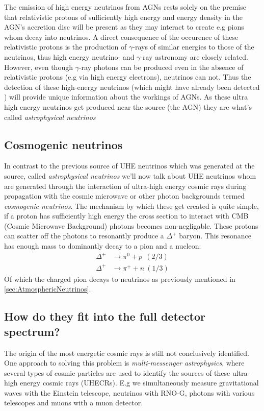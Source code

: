 \documentclass[11pt,a4paper,faculty=we,language=en,doctype=report]{cls/ugent-doc}
\begin{document}
The emission of high energy neutrinos from AGNs rests solely on the premise
that relativistic protons of sufficiently high energy and energy density in the
AGN's accretion disc will be present \cite{NASANeutrinos} as they may interact
to create e.g pions whom decay into neutrinos. A direct consequence of the occurence of these
relativistic protons is the production of $\gamma$-rays of similar energies to
those of the neutrinos, thus high energy neutrino- and $\gamma$-ray astronomy are
closely related.  However, even though $\gamma$-ray photons can be produced
even in the absence of relativistic protons (e.g via high energy electrons),
neutrinos can not.  Thus the detection of these high-energy neutrinos (which
might have already been detected \cite{AGNNeutrino}) will provide unique
information about the workings of AGNs.
As these ultra high energy neutrinos get produced near the source (the AGN)
they are what's called \textit{astrophysical neutrinos}

\subsection{Cosmogenic neutrinos}
In contrast to the previous source of UHE neutrinos which was generated at the
source, called \textit{astrophysical neutrinos} we'll now talk about UHE
neutrinos whom are generated through the interaction of ultra-high energy
cosmic rays during propagation with the cosmic microwave or other photon
backgrounds termed \textit{cosmogenic neutrinos}.  The mechanism by which these
get created is quite simple, if a proton has sufficiently high energy the cross
section to interact with CMB (Cosmic Microwave Background) photons becomes
non-negligable.  These protons can scatter off the photons to resonantly
produce a $\Delta^+$ baryon.  This resonance has enough mass to dominantly
decay to a pion and a nucleon:
\begin{align}
	\Delta^+ &\rightarrow \pi^0 + p \ \ (2/3)\\
	\Delta^+ &\rightarrow \pi^+ + n \ (1/3)
\end{align}
Of which the charged pion decays to neutrinos as previously mentioned in 
\ref{sec:AtmosphericNeutrinos}.
\subsection{How do they fit into the full detector spectrum?}
The origin of the most energetic cosmic rays is still not conclusively
identified. One approach to solving this problem is \textit{multi-messenger
astrophysics}, where several types of cosmic particles are used to identify the
sources of these ultra-high energy cosmic rays (UHECRs). E.g we simultaneously
measure gravitational waves with the Einstein telescope, neutrinos with RNO-G,
photons with various telescopes and muons with a muon detector.
\newpage
\end{document}
